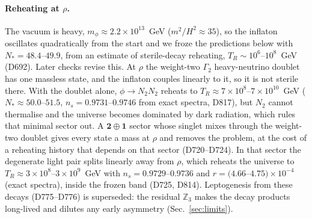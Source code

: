 \documentclass[aps,prd,twocolumn,superscriptaddress,nofootinbib,floatfix]{revtex4-2}
\begin{document}
\paragraph{Reheating at $\rho$.} The vacuum is heavy, $m_\phi\approx2.2\times10^{13}$~GeV ($m^2/H^2\approx35$), so the inflaton oscillates quadratically from the start and we froze the predictions below with $N_*=48.4$--$49.9$, from an estimate of sterile-decay reheating, $T_R\sim10^6$--$10^8$~GeV (D692). Later checks revise this. At $\rho$ the weight-two $\Gamma_2$ heavy-neutrino doublet has one massless state, and the inflaton couples linearly to it, so it is not sterile there. With the doublet alone, $\phi\to N_2N_2$ reheats to $T_R\approx7\times10^8$--$7\times10^{10}$~GeV ($N_*\approx50.0$--$51.5$, $n_s=0.9731$--$0.9746$ from exact spectra, D817), but $N_2$ cannot thermalise and the universe becomes dominated by dark radiation, which rules that minimal sector out. A $\mathbf2\oplus\mathbf1$ sector whose singlet mixes through the weight-two doublet gives every state a mass at $\rho$ and removes the problem, at the cost of a reheating history that depends on that sector (D720--D724). In that sector the degenerate light pair splits linearly away from $\rho$, which reheats the universe to $T_R\approx3\times10^8$--$3\times10^9$~GeV with $n_s=0.9729$--$0.9736$ and $r=(4.66$--$4.75)\times10^{-4}$ (exact spectra), inside the frozen band (D725, D814). Leptogenesis from these decays (D775--D776) is superseded: the residual $\mathbb{Z}_3$ makes the decay products long-lived and dilutes any early asymmetry (Sec.~\ref{sec:limits}).
\end{document}
